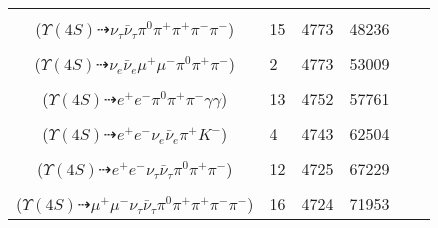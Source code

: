 \documentclass[landscape]{article}
\newcounter{rownumbers}
\newcommand\rn{\stepcounter{rownumbers}\arabic{rownumbers}}
\newcommand{\EOLP}{\\ \hline} %
\newcommand{\topoTags}[1]{#1} %
\begin{document}
\begin{longtable}{clcccc}
\rn & \makecell[l]{ $ 
\Upsilon(4S) \rightarrow B^{0} \bar{B}^{0} ,
B^{0} \rightarrow \nu_{\tau} \bar{\nu}_{\tau} ,
\bar{B}^{0} \rightarrow \omega K_{S}^{0} ,
\omega \rightarrow \pi^{0} \pi^{+} \pi^{-} ,
K_{S}^{0} \rightarrow \pi^{+} \pi^{-} 
$ \\ ($
\Upsilon(4S) \dashrightarrow \nu_{\tau} \bar{\nu}_{\tau} \pi^{0} \pi^{+} \pi^{+} \pi^{-} \pi^{-} 
$) } & \topoTags{15 & }4773 & 48236 \EOLP

\rn & \makecell[l]{ $ 
\Upsilon(4S) \rightarrow B^{0} \bar{B}^{0} ,
B^{0} \rightarrow \pi^{0} J/\psi ,
\bar{B}^{0} \rightarrow \nu_{e} \bar{\nu}_{e} \bar{K}^{0} ,
J/\psi \rightarrow \mu^{+} \mu^{-} ,
\bar{K}^{0} \rightarrow K_{S}^{0} ,
K_{S}^{0} \rightarrow \pi^{+} \pi^{-} 
$ \\ ($
\Upsilon(4S) \dashrightarrow \nu_{e} \bar{\nu}_{e} \mu^{+} \mu^{-} \pi^{0} \pi^{+} \pi^{-} 
$) } & \topoTags{2 & }4773 & 53009 \EOLP

\rn & \makecell[l]{ $ 
\Upsilon(4S) \rightarrow B^{0} \bar{B}^{0} ,
B^{0} \rightarrow \gamma \gamma ,
\bar{B}^{0} \rightarrow \eta J/\psi ,
\eta \rightarrow \pi^{0} \pi^{+} \pi^{-} ,
J/\psi \rightarrow e^{+} e^{-} 
$ \\ ($
\Upsilon(4S) \dashrightarrow e^{+} e^{-} \pi^{0} \pi^{+} \pi^{-} \gamma \gamma 
$) } & \topoTags{13 & }4752 & 57761 \EOLP

\rn & \makecell[l]{ $ 
\Upsilon(4S) \rightarrow B^{0} \bar{B}^{0} ,
B^{0} \rightarrow e^{+} e^{-} ,
\bar{B}^{0} \rightarrow \nu_{e} \bar{\nu}_{e} \bar{K}^{*} ,
\bar{K}^{*} \rightarrow \pi^{+} K^{-} 
$ \\ ($
\Upsilon(4S) \dashrightarrow e^{+} e^{-} \nu_{e} \bar{\nu}_{e} \pi^{+} K^{-} 
$) } & \topoTags{4 & }4743 & 62504 \EOLP

\rn & \makecell[l]{ $ 
\Upsilon(4S) \rightarrow B^{0} \bar{B}^{0} ,
B^{0} \rightarrow \pi^{0} J/\psi ,
\bar{B}^{0} \rightarrow \tau^{-} \bar{\nu}_{\tau} \pi^{+} ,
J/\psi \rightarrow e^{+} e^{-} ,
\tau^{-} \rightarrow \nu_{\tau} \pi^{-} 
$ \\ ($
\Upsilon(4S) \dashrightarrow e^{+} e^{-} \nu_{\tau} \bar{\nu}_{\tau} \pi^{0} \pi^{+} \pi^{-} 
$) } & \topoTags{12 & }4725 & 67229 \EOLP

\rn & \makecell[l]{ $ 
\Upsilon(4S) \rightarrow B^{0} \bar{B}^{0} ,
B^{0} \rightarrow \tau^{+} \nu_{\tau} \pi^{-} ,
\bar{B}^{0} \rightarrow \eta J/\psi ,
\tau^{+} \rightarrow \bar{\nu}_{\tau} \pi^{+} ,
\eta \rightarrow \pi^{0} \pi^{+} \pi^{-} ,
J/\psi \rightarrow \mu^{+} \mu^{-} 
$ \\ ($
\Upsilon(4S) \dashrightarrow \mu^{+} \mu^{-} \nu_{\tau} \bar{\nu}_{\tau} \pi^{0} \pi^{+} \pi^{+} \pi^{-} \pi^{-} 
$) } & \topoTags{16 & }4724 & 71953 \EOLP


\end{longtable}
\end{document}
